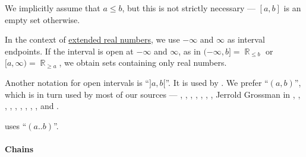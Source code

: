 \begin{comments}
  \item We implicitly assume that \( a \leq b \), but this is not strictly necessary --- \( [a, b] \) is an empty set otherwise.

  \item In the context of \hyperref[def:extended_real_numbers]{extended real numbers}, we use \( -\infty \) and \( \infty \) as interval endpoints. If the interval is open at \( -\infty \) and \( \infty \), as in \( (-\infty, b] = \BbbR_{\leq b} \) or \( [a, \infty) = \BbbR_{\geq a} \), we obtain sets containing only real numbers.

  \item Another notation for open intervals is \enquote{\( ]a, b[ \)}. It is used by . We prefer \enquote{\( (a, b) \)}, which is in turn used by most of our sources --- , , , , , , , Jerrold Grossman in \cite[67]{Rosen1999DiscreteHandbook}, , , , , , ,  , ,  and .

   uses \enquote{\( (a..b) \)}.
\end{comments}

\paragraph{Chains}

